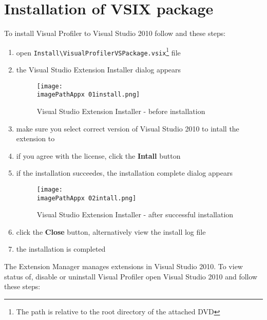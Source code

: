 \section{Installation of VSIX package}
To install Visual Profiler to Visual Studio 2010 follow and these steps: 
\begin{enumerate}
\item open \texttt{Install\textbackslash VisualProfilerVSPackage.vsix}\footnote{The path is relative to the root directory of the attached DVD} file 

\item the Visual Studio Extension Installer dialog appears

\begin{figure}[H]
	\centering
		\texttt{[image: \\imagePathAppx 01install.png]}
		\caption{Visual Studio Extension Installer - before installation}
	\label{fig:0901install}
\end{figure}

\item make sure you select correct version of Visual Studio 2010 to intall the extension to 

\item if you agree with the license, click the \textbf{Intall}
 button

\item if the installation succeedes, the installation complete dialog appears

\begin{figure}[H]
	\centering
		\texttt{[image: \\imagePathAppx 02intall.png]}
		\caption{Visual Studio Extension Installer - after successful installation}
	\label{fig:0902install}
\end{figure}

\item click the \textbf{Close} button, alternatively view the install log file

\item the installation is completed
\end{enumerate}



The Extension Manager manages extensions in Visual Studio 2010. To view status of, disable or uninstall Visual Profiler open Visual Studio 2010 and follow these steps:

